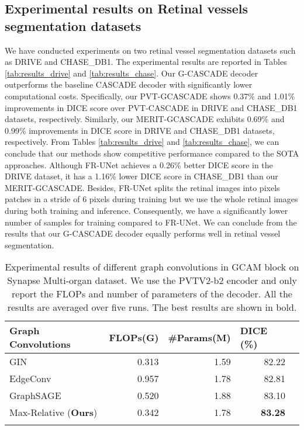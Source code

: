 \documentclass[10pt,twocolumn,letterpaper]{article}
\begin{document}
\color{black}
\subsection{Experimental results on Retinal vessels segmentation datasets}

We have conducted experiments on two retinal vessel segmentation datasets such as DRIVE and CHASE\_DB1. The experimental results are reported in Tables \ref{tab:results_drive} and \ref{tab:results_chase}. Our G-CASCADE decoder outperforms the baseline CASCADE decoder with significantly lower computational costs. Specifically, our PVT-GCASCADE shows 0.37\% and 1.01\% improvements in DICE score over PVT-CASCADE in DRIVE and CHASE\_DB1 datasets, respectively. Similarly, our MERIT-GCASCADE exhibits 0.69\% and 0.99\% improvements in DICE score in DRIVE and CHASE\_DB1 datasets, respectively. From Tables \ref{tab:results_drive} and \ref{tab:results_chase}, we can conclude that our methods show competitive performance compared to the SOTA approaches. Although FR-UNet achieves a 0.26\% better DICE score in the DRIVE dataset, it has a 1.16\% lower DICE score in CHASE\_DB1 than our MERIT-GCASCADE. Besides, FR-UNet splits the retinal images into  pixels patches in a stride of 6 pixels during training but we use the whole retinal images during both training and inference. Consequently, we have a significantly lower number of samples for training compared to FR-UNet. We can conclude from the results that our G-CASCADE decoder equally performs well in retinal vessel segmentation.

\color{black}

\begin{table}[]
\centering 
    {\begin{adjustbox}{width=0.48\textwidth}
{\begin{tabular}{lrrrr}
\toprule
Graph Convolutions   &  \multicolumn{1}{c}{FLOPs(G)} & \multicolumn{1}{c}{\#Params(M)} & \multicolumn{1}{l}{DICE (\%)} \\
\midrule
GIN \cite{xu2018powerful} & 0.313 & 1.59 & 82.22  \\
EdgeConv \cite{wang2019dynamic} & 0.957 & 1.78 & 82.81   \\
GraphSAGE \cite{hamilton2017inductive} & 0.520 & 1.88 & 83.10      \\
Max-Relative \cite{li2019deepgcns} (\textbf{Ours}) & 0.342 & 1.78 & \textbf{83.28}   \\
\bottomrule \\
\end{tabular}}
\end{adjustbox}

}\caption{Experimental results of different graph convolutions in GCAM block on Synapse Multi-organ dataset. We use the PVTV2-b2 encoder and only report the FLOPs and number of parameters of the decoder. All the results are averaged over five runs. The best results are shown in bold.}
\label{tab:different_graph_convs}
\end{table}
\end{document}
